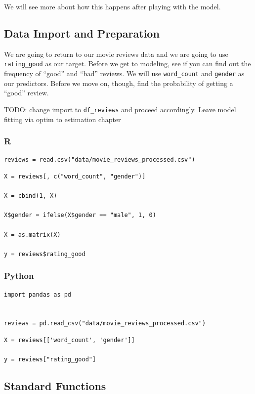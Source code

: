 \documentclass[
  letterpaper,
]{krantz}
\begin{document}
We will see more about how this happens after playing with the model.

\subsection{Data Import and
Preparation}\label{data-import-and-preparation}

We are going to return to our movie reviews data and we are going to use
\texttt{rating\_good} as our target. Before we get to modeling, see if
you can find out the frequency of ``good'' and ``bad'' reviews. We will
use \texttt{word\_count} and \texttt{gender} as our predictors. Before
we move on, though, find the probability of getting a ``good'' review.

TODO: change import to \texttt{df\_reviews} and proceed accordingly.
Leave model fitting via optim to estimation chapter

\subsubsection{R}

\begin{verbatim}
reviews = read.csv("data/movie_reviews_processed.csv")
\end{verbatim}

\begin{verbatim}
X = reviews[, c("word_count", "gender")]

X = cbind(1, X)

X$gender = ifelse(X$gender == "male", 1, 0)

X = as.matrix(X)

y = reviews$rating_good
\end{verbatim}

\subsubsection{Python}

\begin{verbatim}
import pandas as pd


reviews = pd.read_csv("data/movie_reviews_processed.csv")
\end{verbatim}

\begin{verbatim}
X = reviews[['word_count', 'gender']]

y = reviews["rating_good"]
\end{verbatim}

\subsection{Standard Functions}\label{sec-glm-binomial-standard}
\end{document}
